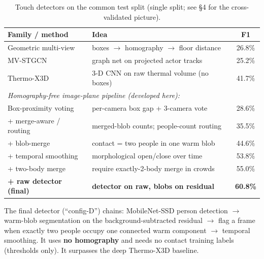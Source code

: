 \documentclass[11pt, a4paper]{article}
\begin{document}
\begin{table}[H]
\centering
\caption{Touch detectors on the common test split (single split; see §4 for the
cross-validated picture).}
\renewcommand{\arraystretch}{1.25}
\begin{tabular}{l l c}
\toprule
\textbf{Family / method} & \textbf{Idea} & \textbf{F1} \\
\midrule
Geometric multi-view      & boxes $\to$ homography $\to$ floor distance & 26.8\% \\
MV-STGCN                  & graph net on projected actor tracks         & 25.2\% \\
Thermo-X3D                & 3-D CNN on raw thermal volume (no boxes)    & 41.7\% \\
\midrule
\multicolumn{3}{l}{\textit{Homography-free image-plane pipeline (developed here):}}\\
\;Box-proximity voting    & per-camera box gap + 3-camera vote          & 28.6\% \\
\;+ merge-aware / routing  & merged-blob counts; people-count routing    & 35.5\% \\
\;+ blob-merge            & contact = two people in one warm blob       & 44.6\% \\
\;+ temporal smoothing    & morphological open/close over time          & 53.8\% \\
\;+ two-body merge        & require exactly-2-body merge in crowds       & 55.0\% \\
\;\textbf{+ raw detector (final)} & \textbf{detector on raw, blobs on residual} & \textbf{60.8\%} \\
\bottomrule
\end{tabular}
\end{table}

\noindent The final detector (``config-D'') chains: MobileNet-SSD person
detection $\to$ warm-blob segmentation on the background-subtracted residual
$\to$ flag a frame when exactly two people occupy one connected warm component
$\to$ temporal smoothing. It uses \textbf{no homography} and needs no contact
training labels (thresholds only). It surpasses the deep Thermo-X3D baseline.

\end{document}
